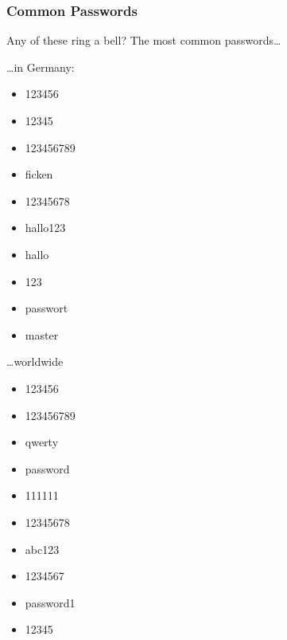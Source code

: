 \documentclass[aspectratio=1610,dvipsnames]{beamer}
\begin{document}
\begin{frame}
\frametitle{Common Passwords}
Any of these ring a bell? The most common passwords\dots
\bigskip\bigskip

\begin{minipage}{0.5\textwidth}
\begin{center}
\dots in Germany:
\end{center}
\bigskip

\begin{minipage}{0.5\textwidth}
\begin{itemize}
\item 123456
\item 12345
\item 123456789
\item ficken
\item 12345678
\end{itemize}
\end{minipage}%
\begin{minipage}{0.5\textwidth}
\begin{itemize}
\item hallo123
\item hallo
\item 123
\item passwort
\item master
\end{itemize}
\end{minipage}
\end{minipage}%
\begin{minipage}{0.5\textwidth}
\begin{center}
\dots worldwide
\end{center}
\bigskip

\begin{minipage}{0.5\textwidth}
\begin{itemize}
\item 123456
\item 123456789
\item qwerty
\item password
\item 111111
\end{itemize}
\end{minipage}%
\begin{minipage}{0.5\textwidth}
\begin{itemize}
\item 12345678
\item abc123
\item 1234567
\item password1
\item 12345
\end{itemize}
\end{minipage}
\end{minipage}

\end{frame}
\end{document}
